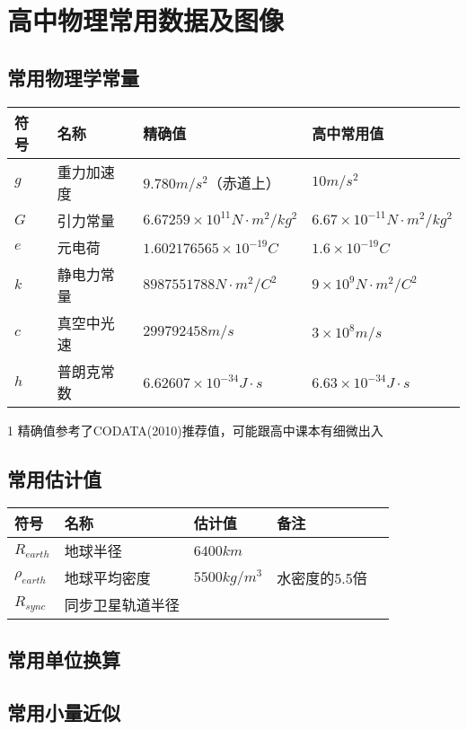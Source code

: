 
\chapter{高中物理常用数据及图像}

\section{常用物理学常量}

\begin{table}[h]
\centering
\begin{threeparttable}
\begin{tabular}{l|l|l|l}
\textbf{符号} & \textbf{名称} & \textbf{精确值}\tnote{1} & \textbf{高中常用值}\\
\hline
$g$ & 重力加速度 & $9.780 m/s^2$（赤道上） & $10m/s^2$ \\
$G$ & 引力常量 & $6.67259 \times 10^{11} N \cdot m^2/kg^2$ & $6.67 \times 10^{-11} N \cdot m^2/kg^2$ \\
$e$ & 元电荷 & $1.602176565 \times 10^{-19} C$ & $1.6 \times 10^{-19} C$ \\ 
$k$ &  静电力常量 & $8987551788 N \cdot m^2 / C^2$ & $9 \times 10^{9} N \cdot m^2 /C^2$ \\
$c$ & 真空中光速 & $299792458 m/s$ & $3 \times 10^{8} m/s$ \\
$h$ & 普朗克常数 & $6.62607 \times 10^{-34} J \cdot s$ & $6.63 \times 10^{-34} J \cdot s$ \\
\hline
\end{tabular}
\begin{tablenotes}
\item[1] 精确值参考了CODATA(2010)推荐值，可能跟高中课本有细微出入
\end{tablenotes}
\end{threeparttable}
\end{table}

\section{常用估计值}

\begin{center}
\begin{tabular}{l|l|l|l|l}
\textbf{符号} & \textbf{名称} & \textbf{估计值} & \textbf{备注} \\
\hline
$R_{earth}$ & 地球半径  & $6400 km$  & \\
$\rho_{earth}$ & 地球平均密度 & $5500kg/m^3$ & 水密度的5.5倍 \\
$R_{sync}$ & 同步卫星轨道半径  &  & \\
\end{tabular}
\end{center}

\section{常用单位换算}

\section{常用小量近似}

